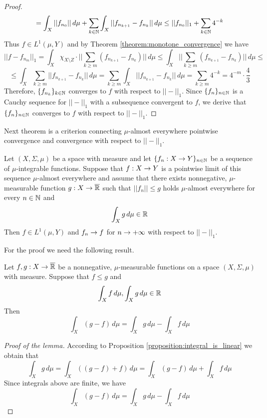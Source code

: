 \begin{proof}
$$= \int_X||f_{n_0}||\,d\mu + \sum_{k\in {\mathbb N}}\int_X||f_{n_{k+1}}-f_{n_k}||\,d\mu \leq ||f_{n_0}||_1 + \sum_{k\in {\mathbb N}}4^{-k} $$
Thus $f\in L^1(\mu,Y)$ and by Theorem \ref{theorem:monotone_convergence} we have
$$||f - f_{n_m}||_1 = \int_X\chi_{X\setminus Z}\cdot \big|\big|\sum_{k\geq m}\left(f_{n_{k+1}} - f_{n_k}\right)\big|\big|\,d\mu \leq  \int_X \big|\big|\sum_{k\geq m}\left(f_{n_{k+1}} - f_{n_k}\right)\big|\big|\,d\mu \leq $$
$$\leq \int_X\sum_{k\geq m}\big|\big|f_{n_{k+1}} - f_{n_k}\big|\big|\,d\mu =\sum_{k\geq m}\int_X\big|\big|f_{n_{k+1}} - f_{n_k}\big|\big|\,d\mu = \sum_{k\geq m}4^{-k} = 4^{-m}\cdot \frac{4}{3} $$
Therefore, $\{f_{n_k}\}_{k\in {\mathbb N}}$ converges to $f$ with respect to $||-||_1$. Since $\{f_n\}_{n\in {\mathbb N}}$ is a Cauchy sequence for $||-||_1$ with a subsequence convergent to $f$, we derive that $\{f_n\}_{n\in {\mathbb N}}$ converges to $f$ with respect to $||-||_1$.
\end{proof}
\noindent
Next theorem is a criterion connecting $\mu$-almost everywhere pointwise convergence and convergence with respect to $||-||_1$.

\begin{theorem}\label{theorem:dominated_convergence}
Let $(X,\Sigma,\mu)$ be a space with measure and let $\{f_n:X\rightarrow Y\}_{n\in {\mathbb N}}$ be a sequence of $\mu$-integrable functions. Suppose that $f:X\rightarrow Y$ is a pointwise limit of this sequence $\mu$-almost everywhere and assume that there exists nonnegative, $\mu$-measurable function $g:X\rightarrow \overline{{\mathbb R}}$ such that $||f_n||\leq g$ holds $\mu$-almost everywhere for every $n\in {\mathbb N}$ and
$$\int_X g\,d\mu\in {\mathbb R}$$
Then $f\in L^1(\mu,Y)$ and $f_n \rightarrow f$ for $n\rightarrow +\infty$ with respect to $||-||_1$.
\end{theorem}
For the proof we need the following result.

\begin{lemma}\label{lemma:difference_of_integrals}
Let $f, g:X\rightarrow \overline{{\mathbb R}}$ be a nonnegative, $\mu$-measurable functions on a space $(X,\Sigma,\mu)$ with measure. Suppose that $f\leq g$ and
$$\int_Xf\,d\mu, \int_Xg\,d\mu\in {\mathbb R}$$
Then
$$\int_X(g-f)\,d\mu = \int_Xg\,d\mu - \int_Xf\,d\mu$$
\end{lemma}
\begin{proof}[Proof of the lemma]
According to Proposition \ref{proposition:integral_is_linear} we obtain that
$$\int_Xg\,d\mu = \int_X\left((g-f) + f\right)\,d\mu = \int_X(g-f)\,d\mu + \int_Xf\,d\mu$$
Since integrals above are finite, we have
$$\int_X(g-f)\,d\mu = \int_Xg\,d\mu - \int_Xf\,d\mu$$
\end{proof}

